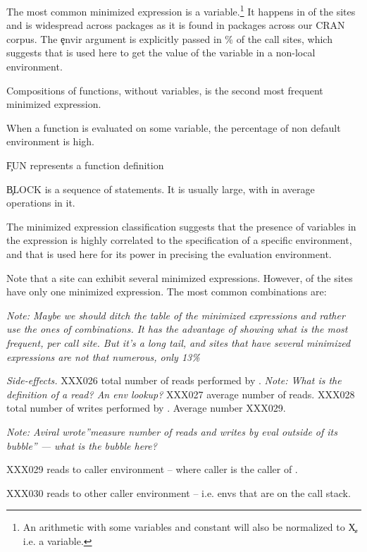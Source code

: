 \documentclass[acmsmall]{acmart}
\newcommand{\mypara}[1]{\medskip\noindent\emph{#1}\xspace}
\newcommand{\NOTE}[1]{{\it Note: #1}\xspace}
\begin{document}
The most common minimized expression is a variable.\footnote{An arithmetic with some variables and constant will also be normalized to \c{X}, i.e. a variable.} It happens in \packageMinimizedpropsitesa of the sites and is widespread across packages as it is found in \packageMinimizedpackagea packages across our CRAN corpus. The \c{envir} argument is explicitly passed in \packageMinimizedpercentenvira\% of the call sites, which suggests that \eval is used here to get the value of the variable in a non-local environment. 

Compositions of functions, without variables, is the second most frequent minimized expression. 

When a function is evaluated on some variable, the percentage of non default environment is high.

\c{FUN} represents a function definition

\c{{BLOCK}} is a sequence of statements. It is usually large, with in average \packageMinimizedoperationsjRnd operations in it.

The minimized expression classification suggests that the presence of variables in the expression is highly correlated to the specification of a specific environment, and that \eval is used here for its power in precising the evaluation environment.


Note that a site can exhibit several minimized expressions. However, \packageNbOneMinimizedPercent of the sites have only one minimized expression. The most common combinations are:


\NOTE{Maybe we should ditch the table of the minimized expressions and rather use the ones of combinations. It has the advantage of showing what is the most frequent, per call site. But it's a long tail, and sites that have several minimized expressions are not that numerous, only 13\%}


\mypara{Side-effects.} XXX026 total number of reads performed by
\eval. \NOTE{What is the definition of a read? An env lookup?} XXX027
average number of reads. XXX028 total number of writes performed by
\eval. Average number XXX029.

\NOTE{Aviral wrote''measure number of reads and writes by eval outside
  of its bubble'' --- what is the bubble here?}

XXX029 reads to caller environment -- where caller is the caller of
\eval.

XXX030 reads to other caller environment -- i.e. envs that are on the
call stack.
\end{document}
